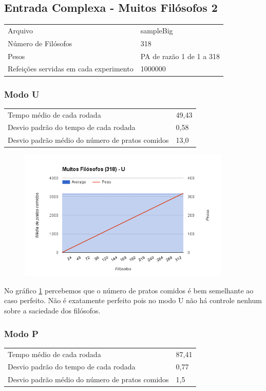 \documentclass[paper=a4, fontsize=11pt]{scrartcl}
\numberwithin{equation}{section}		%
\numberwithin{figure}{section}			%
\numberwithin{table}{section}				%
\begin{document}
\pagebreak
\subsection{Entrada Complexa - Muitos Filósofos 2}
\begin{tabular}{ll}
	Arquivo & sampleBig\\
	Número de Filósofos& 318\\
	Pesos& PA de razão 1 de 1 a 318
	\\
	Refeições servidas em cada experimento& 1000000\\
\end{tabular}
\subsubsection{Modo U}
\begin{tabular}{ll}
	Tempo médio de cada rodada& 49,43\\
	Desvio padrão do tempo de cada rodada& 0,58\\
	Desvio padrão médio do número de pratos comidos& 13,0\\
\end{tabular}

\begin{figure}[H]
	\centering
	\includegraphics[width=0.9\textwidth]{image9}
	\caption{}
	\label{image9}
\end{figure}

No gráfico \ref{image9} percebemos que o número de pratos comidos é bem semelhante ao caso perfeito. Não é exatamente perfeito pois no modo U não há controle nenhum sobre a saciedade dos filósofos.

\pagebreak
\subsubsection{Modo P}
\begin{tabular}{ll}
	Tempo médio de cada rodada& 87,41\\
	Desvio padrão do tempo de cada rodada& 0,77\\
	Desvio padrão médio do número de pratos comidos& 1,5\\
\end{tabular}
\end{document}
